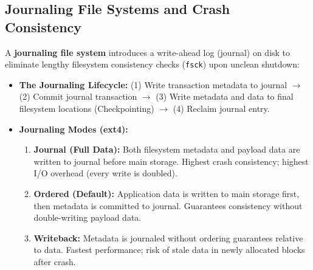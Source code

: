 \subsection{Journaling File Systems and Crash Consistency}
A \textbf{journaling file system} introduces a write-ahead log (journal) on disk to eliminate lengthy filesystem consistency checks (\texttt{fsck}) upon unclean shutdown:
\begin{itemize}
    \item \textbf{The Journaling Lifecycle:} (1) Write transaction metadata to journal $\to$ (2) Commit journal transaction $\to$ (3) Write metadata and data to final filesystem locations (Checkpointing) $\to$ (4) Reclaim journal entry.
    \item \textbf{Journaling Modes (ext4):}
    \begin{enumerate}
        \item \textbf{Journal (Full Data):} Both filesystem metadata and payload data are written to journal before main storage. Highest crash consistency; highest I/O overhead (every write is doubled).
        \item \textbf{Ordered (Default):} Application data is written to main storage first, then metadata is committed to journal. Guarantees consistency without double-writing payload data.
        \item \textbf{Writeback:} Metadata is journaled without ordering guarantees relative to data. Fastest performance; risk of stale data in newly allocated blocks after crash.
    \end{enumerate}
\end{itemize}

